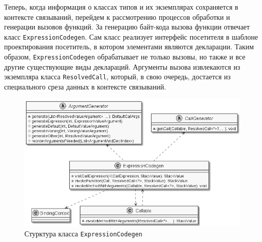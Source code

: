 Теперь, когда информация о классах типов и их экземплярах сохраняется в контексте связываний, перейдем к рассмотрению процессов обработки и генерации вызовов функций. За генерацию байт-кода вызова функции отвечает класс \lstinline{ExpressionCodegen}. Сам класс реализует интерфейс посетителя в шаблоне проектирования  посетитель, в котором элементами являются декларации. Таким образом, \lstinline{ExpressionCodegen} обрабатывает не только вызовы, но также и все другие существующие виды деклараций. Аргументы вызова извлекаются из экземпляра класса \lstinline{ResolvedCall}, который, в свою очередь, достается из специального среза данных в контексте связываний.     

\begin{figure}[htbp]
    \centering
    \includegraphics[width=\textwidth]{resources/06/11_expression_codegen.png}
    \caption{Стурктура класса \lstinline{ExpressionCodegen}}
    \label{fig:expression-codegen}
\end{figure}

